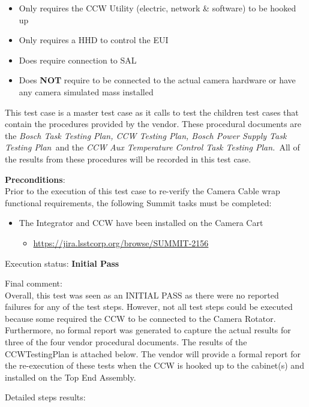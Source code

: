 \documentclass[SE,lsstdraft,STR,toc]{lsstdoc}
\providecommand{\tightlist}{
  \setlength{\itemsep}{0pt}\setlength{\parskip}{0pt}}
\begin{document}
\begin{itemize}
\tightlist
\item
  Only requires the CCW Utility (electric, network \& software) to be
  hooked up
\item
  Only requires a HHD to control the EUI
\item
  Does require connection to SAL
\item
  Does \textbf{NOT} require to be connected to the actual camera
  hardware or have any camera simulated mass installed
\end{itemize}

This test case is a master test case as it calls to test the children
test cases that contain the procedures provided by the vendor. These
procedural documents are the \emph{Bosch Task Testing Plan, CCW Testing
Plan, Bosch Power Supply Task Testing Plan~}and the \emph{CCW Aux
Temperature Control Task Testing Plan.~}All of the results from these
procedures will be recorded in this test case.~

\textbf{ Preconditions}:\\
Prior to the execution of this test case to re-verify the Camera Cable
wrap functional requirements, the following Summit tasks must be
completed:

\begin{itemize}
\tightlist
\item
  The Integrator and CCW have been installed on the Camera Cart

  \begin{itemize}
  \tightlist
  \item
    \url{https://jira.lsstcorp.org/browse/SUMMIT-2156}
  \end{itemize}
\end{itemize}

Execution status: {\bf Initial Pass }

Final comment:\\Overall, this test was seen as an INITIAL PASS as there were no reported
failures for any of the test steps. However, not all test steps could be
executed because some required the CCW to be connected to the Camera
Rotator. Furthermore, no formal report was generated to capture the
actual results for three of the four vendor procedural documents. The
results of the CCWTestingPlan is attached below. The vendor will provide
a formal report for the re-execution of these tests when the CCW is
hooked up to the cabinet(s) and installed on the Top End Assembly.~


Detailed steps results:
\end{document}
